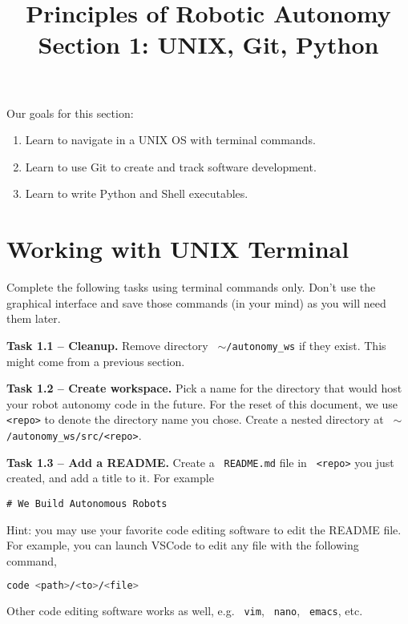 \documentclass{article}
\title{Principles of Robotic Autonomy \\ Section 1: UNIX, Git, Python}
\date{}
\def\code#1{\texttt{\color{magenta} #1}}
\begin{document}
\maketitle
\pagestyle{fancy}

Our goals for this section: \begin{enumerate}
  \item Learn to navigate in a UNIX OS with terminal commands.
  \item Learn to use Git to create and track software development.
  \item Learn to write Python and Shell executables.
\end{enumerate}

\section{Working with UNIX Terminal}

Complete the following tasks using terminal commands only. Don't use the graphical
interface and save those commands (in your mind) as you will need them later.

{\bf Task 1.1 -- Cleanup.} Remove directory \code{$\sim$/autonomy\_ws} if they exist. This
might come from a previous section.

{\bf Task 1.2 -- Create workspace.} Pick a name for the directory that would host your robot
autonomy code in the future. For the reset of this document, we use \code{<repo>} to
denote the directory name you chose. Create a nested directory at
\code{$\sim$/autonomy\_ws/src/<repo>}.

{\bf Task 1.3 -- Add a README.} Create a \code{README.md} file in \code{<repo>} you
just created, and add a title to it. For example
\begin{lstlisting}[numbers=none]
# We Build Autonomous Robots
\end{lstlisting}
Hint: you may use your favorite code editing software to edit the README file.
For example, you can launch VSCode to edit any file with the following command,
\begin{lstlisting}[language=sh, numbers=none]
code <path>/<to>/<file>
\end{lstlisting}
Other code editing software works as well, e.g. \code{vim}, \code{nano}, \code{emacs}, etc.
\end{document}
